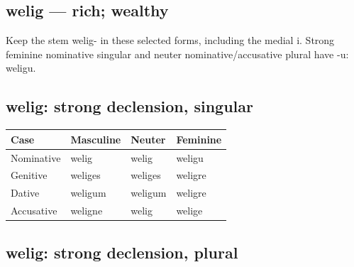 \subsection*{welig — rich; wealthy}

Keep the stem welig- in these selected forms, including the medial i. Strong feminine nominative singular and neuter nominative/\allowbreak{}accusative plural have -u: weligu.

\subsection*{welig: strong declension, singular}

\par\begingroup
\fontsize{10.5}{13.2}\selectfont
\setlength{\LTleft}{0pt}\setlength{\LTright}{\fill}
\noindent
\begin{tabular}{@{}>{\raggedright\arraybackslash}p{28.89mm}>{\raggedright\arraybackslash}p{28.89mm}>{\raggedright\arraybackslash}p{28.89mm}>{\raggedright\arraybackslash}p{28.89mm}@{}}
\toprule
\textbf{Case} & \textbf{Masculine} & \textbf{Neuter} & \textbf{Feminine} \\
\midrule
Nominative & welig & welig & weligu \\
Genitive & weliges & weliges & weligre \\
Dative & weligum & weligum & weligre \\
Accusative & weligne & welig & welige \\
\bottomrule
\end{tabular}
\par\endgroup

\subsection*{welig: strong declension, plural}


